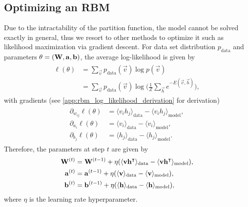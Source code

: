 \subsection{Optimizing an RBM}
Due to the intractability of the partition function, the model cannot be solved exactly in general, thus we resort to other methods to optimize it such as likelihood maximization via gradient descent.
For data set distribution \( p_\text{data} \) and parameters \( \theta = (\mathbf{W}, \mathbf{a}, \mathbf{b}) \), the average log-likelihood is given by
\begin{align}
\begin{split}
    \ell(\theta)
        &= \sum_{\vec{v}} p_{\text{data}}(\vec{v}) \log p(\vec{v}) \\
        &= \sum_{\vec{v}} p_{\text{data}}(\vec{v}) \log \bigg(\frac{1}{Z} \sum_\vec{h} e^{-E(\vec{v},\vec{h})}\bigg),
\end{split}
\end{align}
with gradients (see \cref{app:rbm_log_likelihood_derivation} for derivation)
\begin{align}
\begin{split}
    \partial_{w_{ij}} \ell(\theta)
        &= \langle v_i h_j \rangle_{\text{data}} - \langle v_i h_j \rangle_{\text{model}}, \\
    \partial_{a_i} \ell(\theta)
        &= \langle v_i \rangle_{\text{data}} - \langle v_i \rangle_{\text{model}}, \\
    \partial_{b_j} \ell(\theta)
        &= \langle h_j \rangle_{\text{data}} - \langle h_j \rangle_{\text{model}}.
\end{split}
\end{align}
Therefore, the parameters at step \( t \) are given by
\begin{align}
\begin{split}
    \mathbf{W}^{(t)}
        &= \mathbf{W}^{(t-1)} + \eta(\langle \mathbf{v} \mathbf{h}^\intercal \rangle_{\text{data}} - \langle \mathbf{v} \mathbf{h}^\intercal \rangle_{\text{model}}), \\
    \mathbf{a}^{(t)}
        &= \mathbf{a}^{(t-1)} + \eta(\langle \mathbf{v} \rangle_{\text{data}} - \langle \mathbf{v} \rangle_{\text{model}}), \\
    \mathbf{b}^{(t)}
        &= \mathbf{b}^{(t-1)} + \eta(\langle \mathbf{h} \rangle_{\text{data}} - \langle \mathbf{h} \rangle_{\text{model}}),
\end{split}
\end{align}
where \( \eta \) is the learning rate hyperparameter.

